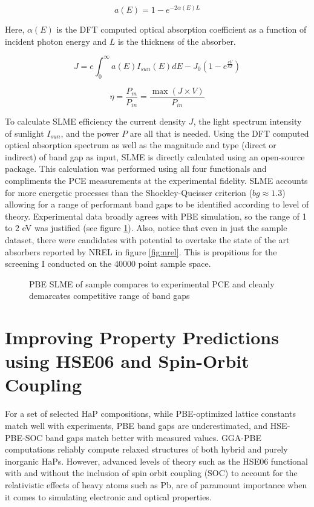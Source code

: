\begin{equation}
\label{eq:absorption_alpha}
a(E)=1-e^{-2\alpha(E)L}
\end{equation}

Here, \(\alpha(E)\) is the DFT computed optical absorption coefficient
as a function of incident photon energy and \(L\) is the thickness of
the absorber.

\begin{equation}
\label{eq:slme_int}
J=e\int_{0}^{\infty} a(E)I_{sun}(E)dE - J_{0}(1-e^{\frac{eV}{kT}})
\end{equation}

\begin{equation}
\label{eq:slme_sum}
\eta = \frac{P_{m}}{P_{in}}=\frac{\max(J \times V)}{P_{in}}
\end{equation}

To calculate SLME efficiency the current density \(J\), the light spectrum intensity of sunlight \(I_{sun}\), and the power \(P\) are all that is needed.
Using the DFT computed optical absorption spectrum as well as the magnitude and type (direct or indirect) of band gap as input, SLME is directly calculated using an open-source package.
\autocite{williams-2022-sl3me}
This calculation was performed using all four functionals and compliments the PCE measurements at the experimental fidelity.
SLME accounts for more energetic processes than the Shockley-Queisser criterion (\(bg \approx 1.3\)) allowing for a range of performant band gaps to be identified according to level of theory.
\autocite[p.1]{yu-2012-ident-poten}
Experimental data \autocite{almora-2020-devic-perfor} broadly agrees with PBE simulation, so the range of 1 to 2 \unit{\electronvolt} was justified (see figure \ref{fig:slme}).
Also, notice that even in just the sample dataset, there were candidates with potential to overtake the state of the art absorbers reported by NREL in figure \ref{fig:nrel}.
This is propitious for the screening I conducted on the 40000 point sample space.

 
\begin{figure}[htbp]
\centering

\caption{\label{fig:slme} PBE SLME of sample compares to experimental PCE and cleanly demarcates competitive range of band gaps}
\end{figure}

\section{Improving Property Predictions using HSE06 and Spin-Orbit Coupling}
\label{sec:org417a4e0}
For a set of selected HaP compositions, while PBE-optimized lattice constants match well with experiments, PBE band gaps are underestimated, and HSE-PBE-SOC band gaps match better with measured values.
GGA-PBE computations reliably compute relaxed structures of both hybrid and purely inorganic HaPs.
However, advanced levels of theory such as the HSE06 functional with and without the inclusion of spin orbit coupling (SOC) to account for the relativistic effects of heavy atoms such as Pb, are of paramount importance when it comes to simulating electronic and optical properties.

